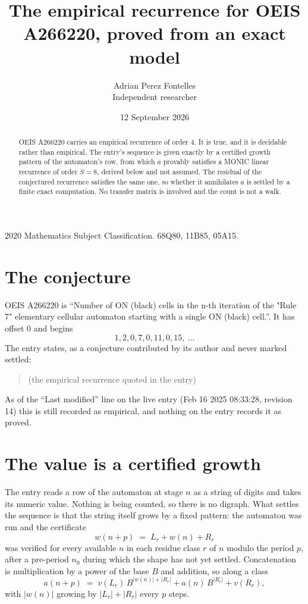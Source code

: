 \documentclass[11pt,a4paper]{article}
\title{The empirical recurrence for OEIS A266220, proved from an exact model}
\author{Adrian Perez Fontelles\\ \small Independent researcher}
\date{12 September 2026}
\theoremstyle{plain}
\theoremstyle{definition}
\begin{document}
\maketitle

\begin{abstract}
OEIS A266220 carries an empirical recurrence of order $4$. It is true, and it is
decidable rather than empirical. The entry's sequence is given exactly by a certified growth pattern of the automaton's row, from
which $a$ provably satisfies a MONIC linear recurrence of order $S=8$, derived below and not
assumed. The residual of the conjectured recurrence satisfies the same one, so whether it
annihilates $a$ is settled by a finite exact computation. No transfer matrix is involved and
the count is not a walk.
\end{abstract}

\noindent\small 2020 Mathematics Subject Classification. 68Q80, 11B85, 05A15.\normalsize

\section{The conjecture}

OEIS A266220 is ``Number of ON (black) cells in the n-th iteration of the "Rule 7" elementary cellular automaton starting with a single ON (black) cell.''. It has offset $0$ and begins
\[
1, 2, 0, 7, 0, 11, 0, 15,\ \dots
\]
The entry states, as a conjecture contributed by its author and never marked settled:
\begin{quote}
(the empirical recurrence quoted in the entry)
\end{quote}
As of the ``Last modified'' line on the live entry (Feb 16 2025 08:33:28, revision 14)
this is still recorded as empirical, and nothing on the entry records it as proved.

\section{The value is a certified growth}

The entry reads a row of the automaton at stage $n$ as a string of digits and takes its
numeric value. Nothing is being counted, so there is no digraph. What settles the sequence is
that the string itself grows by a fixed pattern: the automaton was run and the certificate
\[
w(n+p)\;=\;L_r + w(n) + R_r
\]
was verified for every available $n$ in each residue class $r$ of $n$ modulo the period $p$,
after a pre-period $n_0$ during which the shape has not yet settled. Concatenation is
multiplication by a power of the base $B$ and addition, so along a class
\[
a(n+p)\;=\;v(L_r)\,B^{|w(n)|+|R_r|} + a(n)\,B^{|R_r|} + v(R_r),
\]
with $|w(n)|$ growing by $|L_r|+|R_r|$ every $p$ steps.
\end{document}
